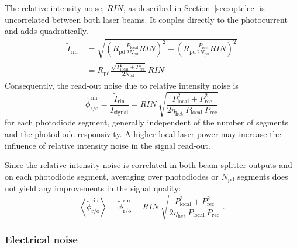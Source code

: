 \documentclass[fleqn,10pt]{<approot>/designer/latexelements/SelfArx} %
\begin{document}
The relative intensity noise, $RIN$, as described in Section~\ref{sec:optelec} is uncorrelated between both laser beams. It couples directly to the photocurrent and adds quadratically. 
\begin{equation}
\begin{split}
\widetilde{I}_\text{rin} ~ & =  \sqrt{\left(R_\text{pd} \frac{P_\text{local}}{2N_\text{pd}} RIN \right)^2 + \left(R_\text{pd} \frac{P_\text{rec}}{2N_\text{pd}}RIN\right)^2}\\
& = R_\text{pd}\frac{\sqrt{P_\text{local}^2 + P_\text{rec}^2}}{2N_\text{pd}}\: RIN
\label{eq:rinnoise}
\end{split}
\end{equation}
Consequently, the read-out noise due to relative intensity noise is
\begin{equation}
\widetilde{\phi}_\text{r/o}^\text{rin}  = \frac{\widetilde{I}_\text{rin}}{I_\text{signal}} = RIN\:\sqrt{\frac{P_\text{local}^2+P_\text{rec}^2}{2\eta_\text{het}\:P_\text{local}\:P_\text{rec}}}
\label{eq:readoutrinnoise}
\end{equation} 
for each photodiode segment, generally independent of the number of segments and the photodiode responsivity. A higher local laser power may increase the influence of relative intensity noise in the signal read-out.

Since the relative intensity noise is correlated in both beam splitter outputs and on each photodiode segment, averaging over photodiodes or $N_\text{pd}$ segments does not yield any improvements in the signal quality:
\begin{equation}
\left<\widetilde{\phi}_\text{r/o}^\text{rin}\right>  = \widetilde{\phi}_\text{r/o}^\text{rin} =  RIN\:\sqrt{\frac{P_\text{local}^2+P_\text{rec}^2}{2\eta_\text{het}\:P_\text{local}\:P_\text{rec}}} ~ .
\label{eq:meanreadoutrinnoise}
\end{equation}

\subsubsection{Electrical noise}
\end{document}
